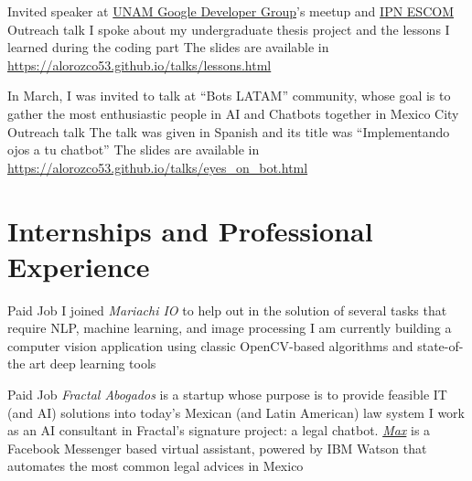 \documentclass[11pt,a4paper,sans]{moderncv} %
\begin{document}
        {Invited speaker at \href{https://www.meetup.com/GDG-UNAM/}{UNAM Google Developer Group}'s meetup and \href{http://www.escom.ipn.mx}{IPN ESCOM}}
        {Outreach talk}
        {I spoke about my undergraduate thesis project and the lessons I learned during the coding part}{}
        {The slides are available in \url{https://alorozco53.github.io/talks/lessons.html}}

        {In March, I was invited to talk at ``Bots LATAM'' community, whose goal is to gather the most enthusiastic people in AI and Chatbots together in Mexico City}
        {Outreach talk}
        {The talk was given in Spanish and its title was ``Implementando ojos a tu chatbot''}{}
        {The slides are available in \url{https://alorozco53.github.io/talks/eyes_on_bot.html}}


\section{Internships and Professional Experience}

        {Paid Job}
        {I joined \emph{Mariachi IO} to help out in the solution of several tasks that require NLP, machine learning, and image processing}
        {I am currently building a computer vision application using classic OpenCV-based algorithms and state-of-the art deep learning tools}
        {}
        {}

        {Paid Job}
        {\emph{Fractal Abogados} is a startup whose purpose is to provide feasible IT (and AI) solutions into today's Mexican (and Latin American) law system}
        {I work as an AI consultant in Fractal's signature project: a legal chatbot. \href{https://m.me/fractal-abogados}{\emph{Max}} is a Facebook Messenger based virtual assistant, powered by IBM Watson that automates the most common legal advices in Mexico}
        {}
        {}
\end{document}
